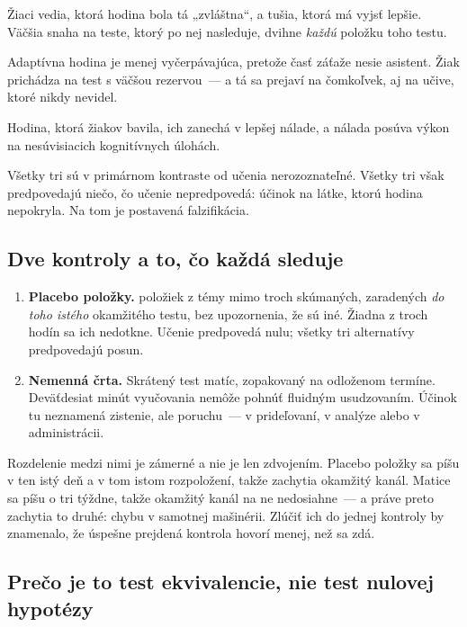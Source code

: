 \begin{description}[leftmargin=0.6cm, nosep]
    \item[\textbf{Očakávanie od účastníka.}] Žiaci vedia, ktorá hodina bola tá „zvláštna“, a tušia, ktorá má vyjsť lepšie. Väčšia snaha na teste, ktorý po nej nasleduje, dvihne \emph{každú} položku toho testu.
    \item[\textbf{Rozdielna zvyšná kapacita.}] Adaptívna hodina je menej vyčerpávajúca, pretože časť záťaže nesie asistent. Žiak prichádza na test s väčšou rezervou~--- a tá sa prejaví na čomkoľvek, aj na učive, ktoré nikdy nevidel.
    \item[\textbf{Okamžitý afekt.}] Hodina, ktorá žiakov bavila, ich zanechá v lepšej nálade, a nálada posúva výkon na nesúvisiacich kognitívnych úlohách.
\end{description}

Všetky tri sú v primárnom kontraste od učenia nerozoznateľné. Všetky tri však predpovedajú niečo, čo učenie nepredpovedá: účinok na látke, ktorú hodina nepokryla. Na tom je postavená falzifikácia.

\subsection{Dve kontroly a to, čo každá sleduje}

\begin{enumerate}[nosep]
    \item \textbf{Placebo položky.} \falPlacebo{} položiek z témy mimo troch skúmaných, zaradených \emph{do toho istého} okamžitého testu, bez upozornenia, že sú iné. Žiadna z troch hodín sa ich nedotkne. Učenie predpovedá nulu; všetky tri alternatívy predpovedajú posun.
    \item \textbf{Nemenná črta.} Skrátený test matíc, zopakovaný na odloženom termíne. Deväťdesiat minút vyučovania nemôže pohnúť fluidným usudzovaním. Účinok tu neznamená zistenie, ale poruchu~--- v prideľovaní, v analýze alebo v administrácii.
\end{enumerate}

Rozdelenie medzi nimi je zámerné a nie je len zdvojením. Placebo položky sa píšu v ten istý deň a v tom istom rozpoložení, takže zachytia okamžitý kanál. Matice sa píšu o tri týždne, takže okamžitý kanál na ne nedosiahne~--- a práve preto zachytia to druhé: chybu v samotnej mašinérii. Zlúčiť ich do jednej kontroly by znamenalo, že úspešne prejdená kontrola hovorí menej, než sa zdá.

\subsection{Prečo je to test ekvivalencie, nie test nulovej hypotézy}

